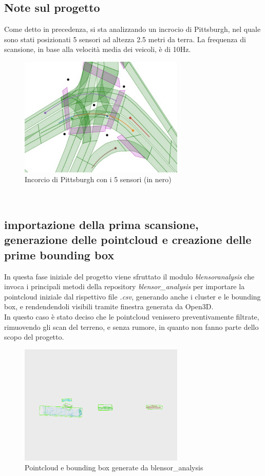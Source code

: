 \documentclass[italian]{article}
\begin{document}
\subsection{Note sul progetto}
Come detto in precedenza, si sta analizzando un incrocio di Pittsburgh, nel quale sono stati posizionati 5 sensori ad altezza 2.5 metri da terra. La frequenza di scansione, in base alla velocità media dei veicoli, è di 10Hz.
\begin{figure}[H]
	\centering
	\includegraphics[width=0.7\textwidth]{junction_sensors}
	\footnotesize
	\caption{Incorcio di Pittsburgh con i 5 sensori (in nero)}
\end{figure}\\
\subsection{importazione della prima scansione, generazione delle pointcloud e creazione delle prime bounding box}
In questa fase iniziale del progetto viene sfruttato il modulo \textit{blensoranalysis} che invoca i principali metodi della repository \textit{blensor\_analysis} per importare la pointcloud iniziale dal rispettivo file \textit{.csv}, generando anche i cluster e le bounding box, e rendendendoli visibili tramite finestra generata da Open3D.\\
In questo caso è stato deciso che le pointcloud venissero preventivamente filtrate, rimuovendo gli scan del terreno, e senza rumore, in quanto non fanno parte dello scopo del progetto.
\begin{figure}[H]
	\centering
	\includegraphics[width=0.7\textwidth]{blensor_analysis}
	\footnotesize
	\caption{Pointcloud e bounding box generate da blensor\_analysis}
\end{figure}\\
\end{document}
